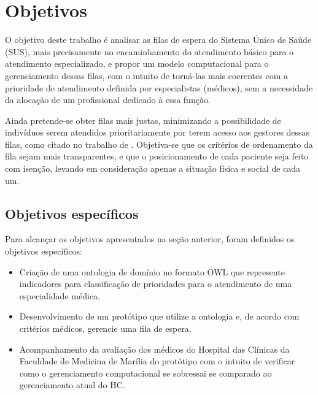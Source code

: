 \section{Objetivos}
    O objetivo deste trabalho é analisar as filas de espera do Sistema Único de Saúde (SUS), mais precisamente no encaminhamento do atendimento básico para o atendimento especializado, e propor um modelo computacional para o gerenciamento dessas filas, com o intuito de torná-las mais coerentes com a prioridade de atendimento definida por especialistas (médicos), sem a necessidade da alocação de um profissional dedicado à essa função. 
    
    Ainda pretende-se obter filas mais justas,  minimizando a possibilidade de indivíduos serem atendidos prioritariamente por terem acesso aos gestores dessas filas, como citado no trabalho de . Objetiva-se que os critérios de ordenamento da fila sejam mais transparentes, e que o posicionamento de cada paciente seja feito com isenção, levando em consideração apenas a situação física e social de cada um.

\subsection{Objetivos específicos}

	Para alcançar os objetivos apresentados na seção anterior, foram definidos os objetivos específicos:
    
    \begin{itemize}
    	\item Criação de uma ontologia de domínio no formato OWL que represente indicadores para classificação de prioridades para o atendimento de uma especialidade médica.
        \item Desenvolvimento de um protótipo que utilize a ontologia e, de acordo com critérios médicos, gerencie uma fila de espera.
        \item Acompanhamento da avaliação dos médicos do Hospital das Clínicas da Faculdade de Medicina de Marília do protótipo com o intuito de verificar como o gerenciamento computacional se  sobressai se comparado ao gerenciamento atual do HC.
    \end{itemize}
